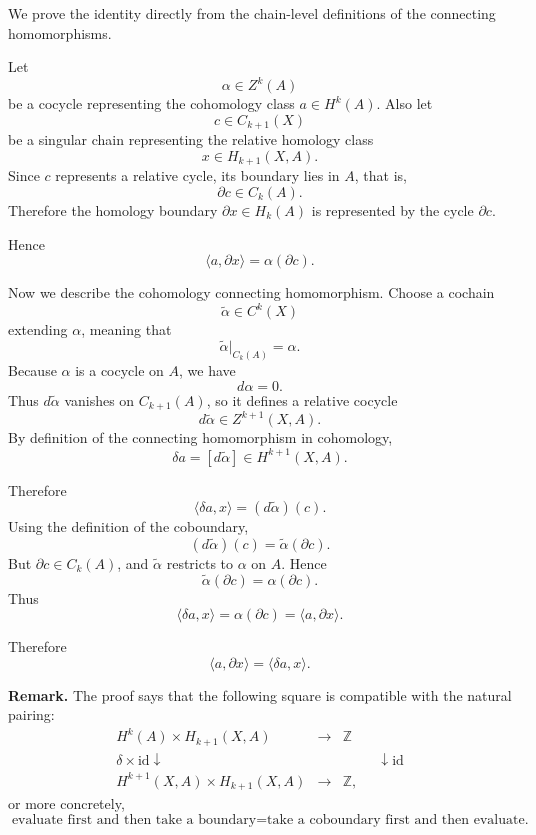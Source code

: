\begin{solution}
We prove the identity directly from the chain-level definitions of the connecting homomorphisms.

Let
\[
\alpha\in Z^k(A)
\]
be a cocycle representing the cohomology class \(a\in H^k(A)\). Also let
\[
c\in C_{k+1}(X)
\]
be a singular chain representing the relative homology class
\[
x\in H_{k+1}(X,A).
\]
Since \(c\) represents a relative cycle, its boundary lies in \(A\), that is,
\[
\partial c\in C_k(A).
\]
Therefore the homology boundary \(\partial x\in H_k(A)\) is represented by the cycle \(\partial c\).

Hence
\[
\langle a,\partial x\rangle
=
\alpha(\partial c).
\]

Now we describe the cohomology connecting homomorphism. Choose a cochain
\[
\widetilde{\alpha}\in C^k(X)
\]
extending \(\alpha\), meaning that
\[
\widetilde{\alpha}|_{C_k(A)}=\alpha.
\]
Because \(\alpha\) is a cocycle on \(A\), we have
\[
d\alpha=0.
\]
Thus \(d\widetilde{\alpha}\) vanishes on \(C_{k+1}(A)\), so it defines a relative cocycle
\[
d\widetilde{\alpha}\in Z^{k+1}(X,A).
\]
By definition of the connecting homomorphism in cohomology,
\[
\delta a=[d\widetilde{\alpha}]\in H^{k+1}(X,A).
\]

Therefore
\[
\langle \delta a,x\rangle
=
(d\widetilde{\alpha})(c).
\]
Using the definition of the coboundary,
\[
(d\widetilde{\alpha})(c)
=
\widetilde{\alpha}(\partial c).
\]
But \(\partial c\in C_k(A)\), and \(\widetilde{\alpha}\) restricts to \(\alpha\) on \(A\). Hence
\[
\widetilde{\alpha}(\partial c)
=
\alpha(\partial c).
\]
Thus
\[
\langle \delta a,x\rangle
=
\alpha(\partial c)
=
\langle a,\partial x\rangle.
\]

Therefore
\[
\boxed{
	\langle a,\partial x\rangle=\langle \delta a,x\rangle .
}
\]

\par

\textbf{Remark.}
The proof says that the following square is compatible with the natural pairing:
\[
\begin{array}{ccc}
	H^k(A)\times H_{k+1}(X,A) & \longrightarrow & \mathbb Z \\[1mm]
	\delta\times \mathrm{id}\downarrow\phantom{\delta\times \mathrm{id}} 
	&& 
	\phantom{\mathrm{id}\times \partial}\downarrow \mathrm{id} \\[1mm]
	H^{k+1}(X,A)\times H_{k+1}(X,A) & \longrightarrow & \mathbb Z ,
\end{array}
\]
or more concretely,
\[
\boxed{
	\text{evaluate first and then take a boundary}
	=
	\text{take a coboundary first and then evaluate.}
}
\]

\par
\end{solution}

